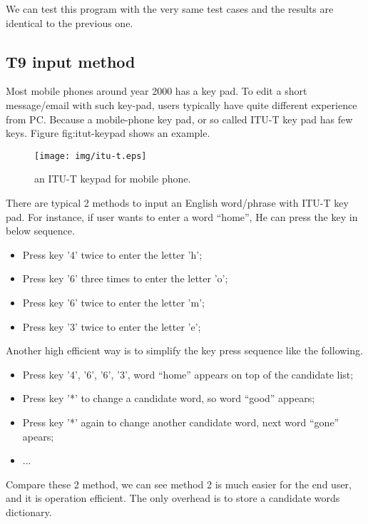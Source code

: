 \documentclass{article}
\begin{document}
We can test this program with the very same test cases and the results are
identical to the previous one.

\subsection{T9 input method}
Most mobile phones around year 2000 has a key pad. To edit a short message/email
with such key-pad, users typically have quite different experience from PC.
Because a mobile-phone key pad, or so called ITU-T key pad has few keys.
Figure {fig:itut-keypad} shows an example.

\begin{figure}[htbp]
       \begin{center}
	\texttt{[image: img/itu-t.eps]}
        \caption{an ITU-T keypad for mobile phone.}
        \label{fig:itut-keypad}
       \end{center}
\end{figure}

There are typical 2 methods to input an English word/phrase with ITU-T key pad.
For instance, if user wants to enter a word ``home'', He can press the key
in below sequence.

\begin{itemize}
\item Press key '4' twice to enter the letter 'h';
\item Press key '6' three times to enter the letter 'o';
\item Press key '6' twice to enter the letter 'm';
\item Press key '3' twice to enter the letter 'e';
\end{itemize}

Another high efficient way is to simplify the key press sequence like the
following.

\begin{itemize}
\item Press key '4', '6', '6', '3', word ``home'' appears on top of the candidate list;
\item Press key '*' to change a candidate word, so word ``good'' appears;
\item Press key '*' again to change another candidate word, next word ``gone'' apears;
\item ...
\end{itemize}

Compare these 2 method, we can see method 2 is much easier for the end user, and
it is operation efficient. The only overhead is to store a candidate words dictionary.
\end{document}
